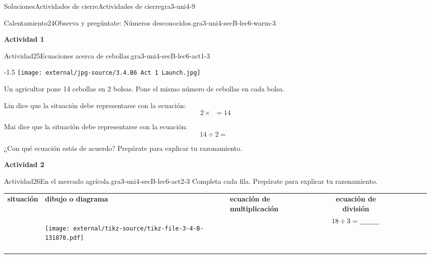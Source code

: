 \documentclass[twoside,10pt,]{article}
\newcommand{\tabularfont}{\relax}
\newcommand{\hrulethin}  {\noalign{\hrule height 0.04em}}
\newcommand{\hrulethick} {\noalign{\hrule height 0.11em}}
\begin{document}
\begin{solutions-section}{Soluciones}{Actividades de cierre}{}{Actividades de cierre}{}{}{gra3-uni4-9}
\begin{explorationsolution}{Calentamiento}{24}{Observa y pregúntate: Números desconocidos.}{gra3-uni4-secB-lec6-warm-3}
\begin{sidebyside}{2}{0}{0}{0}
\end{sidebyside}%
\end{explorationsolution}%
\par\medskip
\noindent\textbf{\large{}\space\textperiodcentered\space{}Actividad 1}
\begin{activitysolution}{Actividad}{25}{Ecuaciones acerca de cebollas.}{gra3-uni4-secB-lec6-act1-3}%
\begin{image}{0.15}{0.7}{0.15}{-1.5\baselineskip}%
\texttt{[image: external/jpg-source/3.4.B6 Act 1 Launch.jpg]}
\end{image}%
Un agricultor pone 14 cebollas en 2 bolsas. Pone el mismo número de cebollas en cada bolsa.%
\par
Lin dice que la situación debe representarse con la ecuación:%
\begin{equation*}
2 \times \boxed{\phantom{3}} = 14
\end{equation*}
%
\par
Mai dice que la situación debe representarse con la ecuación:%
\begin{equation*}
14 \div 2 = \boxed{\phantom{3}}
\end{equation*}
%
\par
¿Con qué ecuación estás de acuerdo? Prepárate para explicar tu razonamiento.%
\end{activitysolution}%
\par\medskip
\noindent\textbf{\large{}\space\textperiodcentered\space{}Actividad 2}
\begin{activitysolution}{Actividad}{26}{En el mercado agrícola.}{gra3-uni4-secB-lec6-act2-3}%
Completa cada fila. Prepárate para explicar tu razonamiento.%
\begin{center}%
{\tabularfont%
\begin{tabular}{AlAcAcAcA}\hrulethin
{\bfseries{}situación}&{\bfseries{}dibujo o diagrama}&{\bfseries{}ecuación de multiplicación}&{\bfseries{}ecuación de división}\tabularnewline\hrulethick
{}&\begin{image}{0}{1}{0}{}%
\texttt{[image: external/tikz-source/tikz-file-3-4-B-131870.pdf]}
\end{image}%
&&\(18 \div 3 = \underline{\hspace{1 cm}}\)\tabularnewline\hrulethin
{}
\end{tabular}}
\end{center}
\end{activitysolution}
\end{solutions-section}
\end{document}
